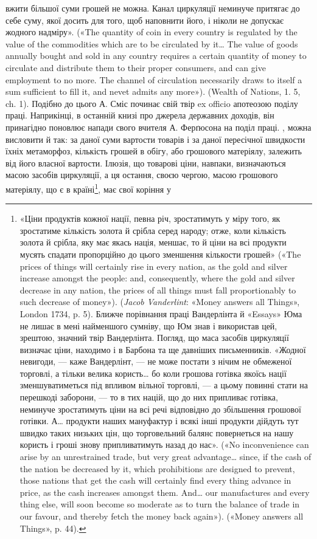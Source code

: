 {вжити більшої суми грошей не можна. Канал циркуляції
неминуче притягає до себе суму, якої досить для того, щоб наповнити
його, і ніколи не допускає жодного надміру». («The quantity of coin in
every country is regulated by the value of the commodities which are to
be circulated by it\dots{} The value of goods annually bought and sold in any
country requires a certain quantity of money to circulate and distribute
them to their proper consumers, and can give employment to no more. The
channel of circulation necessarily draws to itself a sum sufficient to fill
it, and nevet admits any more»). (Wealth of Nations, 1. 5, ch. 1). Подібно
до цього А. Сміс починає свій твір ex officio апотеозою поділу праці. Наприкінці,
в останній книзі про джерела державних доходів, він принагідно
поновлює напади свого вчителя А. Ферґюсона на поділ праці.
}, можна висловити й так: за даної суми вартости
товарів і за даної пересічної швидкости їхніх метаморфоз,
кількість грошей в обігу, або грошового матеріялу, залежить від
його власної вартости. Ілюзія, що товарові ціни, навпаки, визначаються
масою засобів циркуляції, а ця остання, своєю чергою,
масою грошового матеріялу, що є в країні\footnote{
«Ціни продуктів кожної нації, певна річ, зростатимуть у міру
того, як зростатиме кількість золота й срібла серед народу; отже, коли
кількість золота й срібла, яку має якась нація, меншає, то й ціни на всі
продукти мусять спадати пропорційно до цього зменшення кількости грошей»
(«The prices of things will certainly rise in every nation, as the gold
and silver increase amongst the people: and, consequently, where the gold
and silver decrease in any nation, the prices of all things must fall proportionably
to such decrease of money»). (\emph{Jacob Vanderlint}: «Money answers
all Things», London 1734, p. 5). Ближче порівнання праці Вандерлінта
й «Essays» Юма не лишає в мені найменшого сумніву, що Юм
знав і використав цей, зрештою, значний твір Вандерлінта. Погляд, що
маса засобів циркуляції визначає ціни, находимо і в Барбона та ще давніших
письменників. «Жодної невигоди, — каже Вандерлінт, — не може
постати з нічим не обмеженої торговлі, а тільки велика користь\dots{} бо коли
грошова готівка якоїсь нації зменшуватиметься під впливом вільної
торговлі, — а цьому повинні стати на перешкоді заборони, — то в тих націй,
що до них припливає готівка, неминуче зростатимуть ціни на всі
речі відповідно до збільшення грошової готівки. А\dots{} продукти наших мануфактур
і всякі інші продукти дійдуть тут швидко таких низьких цін,
що торговельний балянс повернеться на нашу користь і гроші знову припливатимуть
назад до нас». («No inconvenience can arise by an unrestrained
trade, but very great advantage\dots{} since, if the cash of the nation be decreased
by it, which prohibitions are designed to prevent, those nations that
get the cash will certainly find every thing advance in price, as the cash
increases amongst them. And\dots{} our manufactures and every thing else, will
soon become so moderate as to turn the balance of trade in our favour, and thereby
fetch the money back again»). («Money answers all Things», p. 44).
}, має свої коріння у
\parbreak{}  %
